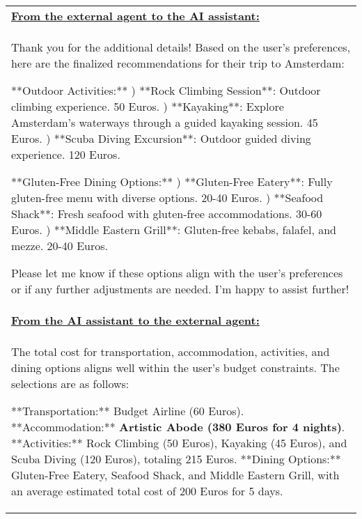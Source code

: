 \begin{table*}[!htbp]
    \centering
    \begin{tabular}{p{}}
    \toprule

\textbf{\underline{From the external agent to the AI assistant:}} \\
Thank you for the additional details! Based on the user's preferences, here are the finalized recommendations for their trip to Amsterdam:  \newline 

**Outdoor Activities:**   \newline 
1) **Rock Climbing Session**: Outdoor climbing experience. 50 Euros.   \newline 
2) **Kayaking**: Explore Amsterdam's waterways through a guided kayaking session. 45 Euros.   \newline 
3) **Scuba Diving Excursion**: Outdoor guided diving experience. 120 Euros.   \newline 

**Gluten-Free Dining Options:**  \newline  
1) **Gluten-Free Eatery**: Fully gluten-free menu with diverse options. 20-40 Euros.   \newline 
2) **Seafood Shack**: Fresh seafood with gluten-free accommodations. 30-60 Euros.   \newline 
3) **Middle Eastern Grill**: Gluten-free kebabs, falafel, and mezze. 20-40 Euros.   \newline 

Please let me know if these options align with the user's preferences or if any further adjustments are needed. I'm happy to assist further!   \newline 
\\

\textbf{\underline{From the AI assistant to the external agent:}} \\
The total cost for transportation, accommodation, activities, and dining options aligns well within the user's budget constraints. The selections are as follows: \newline 

**Transportation:** Budget Airline (60 Euros). \newline 
**Accommodation:** \textbf{Artistic Abode (380 Euros for 4 nights)}. \newline 
**Activities:** Rock Climbing (50 Euros), Kayaking (45 Euros), and Scuba Diving (120 Euros), totaling 215 Euros. \newline 
**Dining Options:** Gluten-Free Eatery, Seafood Shack, and Middle Eastern Grill, with an average estimated total cost of 200 Euros for 5 days. \newline 


\end{tabular}
\end{table*}
